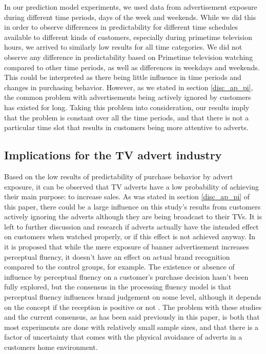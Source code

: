 \documentclass[review]{elsarticle}
\begin{document}
In our prediction model experiments, we used data from advertisement exposure during different time periods, days of the week and weekends. While we did this in order to observe differences in predictability for different time schedules available to different kinds of customers, especially during primetime television hours, we arrived to similarly low results for all time categories. We did not observe any difference in predictability based on Primetime television watching compared to other time periods, as well as differences in weekdays and weekends. This could be interpreted as there being little influence in time periods and changes in purchasing behavior. However, as we stated in section \ref{disc_ap_pi}, the common problem with advertisements being actively ignored by customers has existed for long. Taking this problem into consideration, our results imply that the problem is constant over all the time periods, and that there is not a particular time slot that results in customers being more attentive to adverts.

\subsection{Implications for the TV advert industry}
\label{disc_advert}

Based on the low results of predictability of purchase behavior by advert exposure, it can be observed that TV adverts have a low probability of achieving their main purpose: to increase sales. As was stated in section \ref{disc_ap_pi} of this paper, there could be a large influence on this study's results from customers actively ignoring the adverts although they are being broadcast to their TVs. It is left to further discussion and research if adverts actually have the intended effect on customers when watched properly, or if this effect is not achieved anyway. In \cite{14} it is proposed that while the mere exposure of banner advertisement increases perceptual fluency, it doesn't have an effect on actual brand recognition compared to the control groups, for example. The existence or absence of influence by perceptual fluency on a customer's purchase decision hasn't been fully explored, but the consensus in the processing fluency model is that perceptual fluency influences brand judgement on some level, although it depends on the concept if the reception is positive or not \cite{21}. The problem with these studies and the current consensus, as has been said previously in this paper, is both that most experiments are done with relatively small sample sizes, and that there is a factor of uncertainty that comes with the physical avoidance of adverts in a customers home environment.
\end{document}
